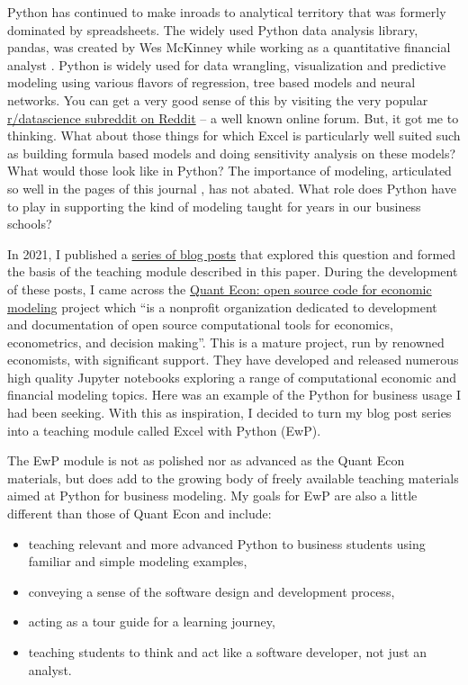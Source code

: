 \documentclass[ited,blindrev]{informs3}              %
\begin{document}
Python has continued to make inroads to analytical territory that was formerly dominated by spreadsheets. The widely used Python data analysis library, pandas, was created by Wes McKinney while working as a quantitative financial analyst \cite{mckinney2022python}. Python is widely used for data wrangling, visualization and predictive modeling using various flavors of regression, tree based models and neural networks. You can get a very good sense of this by visiting the very popular \href{https://www.reddit.com/r/datascience/}{r/datascience subreddit on Reddit} -- a well known online forum. But, it got me to thinking. What about those things for which Excel is particularly well suited such as building formula based models and doing sensitivity analysis on these models? What would those look like in Python? The importance of modeling, articulated so well in the pages of this journal \cite{powellTeachingModelingManagement2001}, has not abated. What role does Python have to play in supporting the kind of modeling taught for years in our business schools?

In 2021, I published a \href{https://bitsofanalytics.org/#category=excel}{series of blog posts} that explored this question and formed the basis of the teaching module described in this paper. During the development of these posts, I came across the \href{https://quantecon.org/}{Quant Econ: open source code for economic modeling} project which ``is a nonprofit organization dedicated to development and documentation of open source computational tools for economics, econometrics, and decision making''. This is a mature project, run by renowned economists, with significant support. They have developed and released numerous high quality Jupyter notebooks exploring a range of computational economic and financial modeling topics. Here was an example of the Python for business usage I had been seeking. With this as inspiration, I decided to turn my blog post series into a teaching module called Excel with Python (EwP). 

The EwP module is not as polished nor as advanced as the Quant Econ materials, but does add to the growing body of freely available teaching materials aimed at Python for business modeling. My goals for EwP are also a little different than those of Quant Econ and include:

\begin{itemize}
	\item teaching relevant and more advanced Python to business students using familiar and simple modeling examples,
	\item conveying a sense of the software design and development process,
	\item acting as a tour guide for a learning journey,
	\item teaching students to think and act like a software developer, not just an analyst.
\end{itemize}
\end{document}

